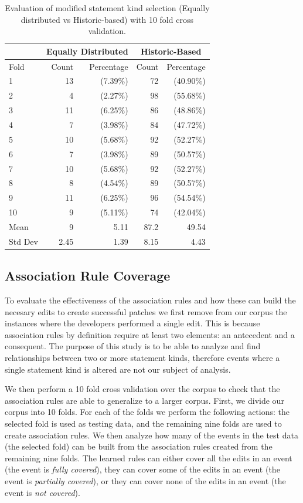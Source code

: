 \documentclass[sigconf]{acmart}
\begin{document}
\begin{table}[]
\centering
\caption{Evaluation of modified statement kind selection (Equally distributed vs Historic-based) with 10 fold cross validation.}
\label{10FoldEDvsHB}
\begin{tabular}{l|rr|rr}
\toprule
   &   \multicolumn{2}{c|}{ Equally Distributed}   &   \multicolumn{2}{|c}{ Historic-Based} \\
\midrule
Fold  &   Count & Percentage  &  Count & Percentage  \\
\midrule
1&13&(7.39\%) & 72&(40.90\%) \\
2&4&(2.27\%) & 98&(55.68\%) \\
3&11&(6.25\%) & 86&(48.86\%) \\
4&7&(3.98\%) & 84&(47.72\%) \\
5&10&(5.68\%) & 92&(52.27\%) \\
6&7&(3.98\%) & 89&(50.57\%) \\
7&10&(5.68\%) & 92&(52.27\%) \\
8&8&(4.54\%) & 89&(50.57\%) \\
9&11&(6.25\%) & 96&(54.54\%) \\
10&9&(5.11\%) & 74&(42.04\%) \\
\bottomrule
Mean &9 & 5.11 & 87.2 & 49.54 \\
\bottomrule
Std Dev & 2.45 & 1.39 & 8.15 & 4.43 \\
\bottomrule

\end{tabular}
\end{table}



\subsection{Association Rule Coverage}
To evaluate the effectiveness
of the association rules and how these can build the
necesary edits to create successful patches we first
remove from our corpus the instances where the developers
performed a single edit. This is because association rules
by definition require at least two elements: an antecedent
and a consequent. The purpose of this study is to be able to
analyze and find relationships between two or more statement
kinds, therefore events where a single statement kind is altered
are not our subject of analysis.

We then perform a 10 fold cross validation over the corpus to 
check that the association rules are able to generalize to a
larger corpus. First, we divide our corpus into 10 folds.
For each of the folds we perform the following actions:
the selected fold is used as testing data, and the
remaining nine folds are used to create association rules.
We then analyze how many of the events in the test data
(the selected fold) can be built from the association 
rules created from the remaining nine folds.
The learned rules can either cover all the edits in an event (the 
event is \emph{fully covered}), they can cover some of the edits in an 
event (the event is \emph{partially covered}), or they can cover none of
the edits in an event (the event is \emph{not covered}).
\end{document}
